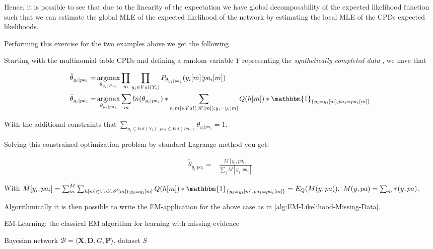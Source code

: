 \documentclass[11pt]{article}
\begin{document}
\begin{article}
Hence, it is possible to see that due to the linearity of the
expectation we have global decomposability of the expected
likelihood function such that we can estimate the global MLE of
the expected likelihood of the network by estimating the local MLE
of the CPDs expected likelihoods.

Performing this exercise for the two examples above we get the
following.

Starting with the multinomial table CPDs and defining a random
variable \(Y\) representing the \emph{synthetically completed data} \(<H, D>\),
we have that

\begin{align} \label{eq:solution}
\tilde{\theta}_{y_i | pa_i} =& \operatorname*{argmax}_{\theta_{y_i | Pa_i}}  \prod_m \prod_{y_i \in Val(Y_i)} P_{\theta_{y_i|pa_i}}(y_i[m]|pa_i[m]) \nonumber  \\
\tilde{\theta}_{y_i | pa_i} =& \operatorname*{argmax}_{\theta_{y_i | pa_i}} \sum_m ln(\theta_{y_i | pa_i}) * \sum_{h[m] \in Val(\mathscr{H}[m]) : y_i = y_i[m]} Q(h[m]) * \mathbbm{1}_{\{y_i = y_i[m], pa_i = pa_i[m]\}}
\end{align}

With the additional constraints that \(\sum_{y_i \in Val(Y_i), pa_i
     \in Val(Pa_i)} \theta_{y_i | pa_i} = 1\).

Solving this constrained optimization problem by standard
Lagrange method you get: 

\begin{align} \label{eq:solution}
\tilde{\theta}_{y_i | pa_i} =& \frac{\bar{M}[y_i, pa_i]}{\sum_j \bar{M}[y_j, pa_i]}
\end{align}

With \(\bar{M}[y_i, pa_i] = \sum_m^M \sum_{h[m] \in
     Val(\mathscr{H}[m]): y_i = y_i[m]} Q(h[m]) * \mathbbm{1}_{\{y_i = y_i[m], pa_i =
     pa_i[m]\}} = E_Q(M(y, pa)), \ M(y, pa) = \sum_m \tau(y,pa)\).

Algorithmically it is then possible to write the EM-application for
the above case as in \ref{alg:EM-Likelihood-Missing-Data}.

\algrenewcommand\algorithmicindent{1.5em}%

\begin{algorithm*}[h!]
\caption{EM-Learning: the classical EM algorithm for learning with missing evidence}
\label{alg:EM-Likelihood-Missing-Data}
\vspace{-10pt}
\begin{multicols}{2}
\begin{algorithmic}[1] 
\Require Bayesian network $\mathcal{B}=\langle \mathbf{X},\mathbf{D}, G, \mathbf{P} \rangle$, dataset $S$ 


\end{algorithmic}
\end{multicols}
\end{algorithm*}
\end{article}
\end{document}
